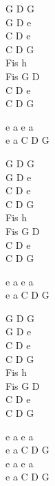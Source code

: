 \begin{chord}
    G D G\\
    G D e\\
    C D e\\
    C D G\\	
    Fis h\\
    Fis G D\\
    C D e\\
    C D G

    e a e a\\
    e a C D G

    G D G\\
    G D e\\
    C D e\\
    C D G\\	
    Fis h\\
    Fis G D\\
    C D e\\
    C D G

    e a e a\\
    e a C D G

    G D G\\
    G D e\\
    C D e\\
    C D G\\	
    Fis h\\
    Fis G D\\
    C D e\\
    C D G

    e a e a\\
    e a C D G\\
    e a e a\\
    e a C D G	
\end{chord}
